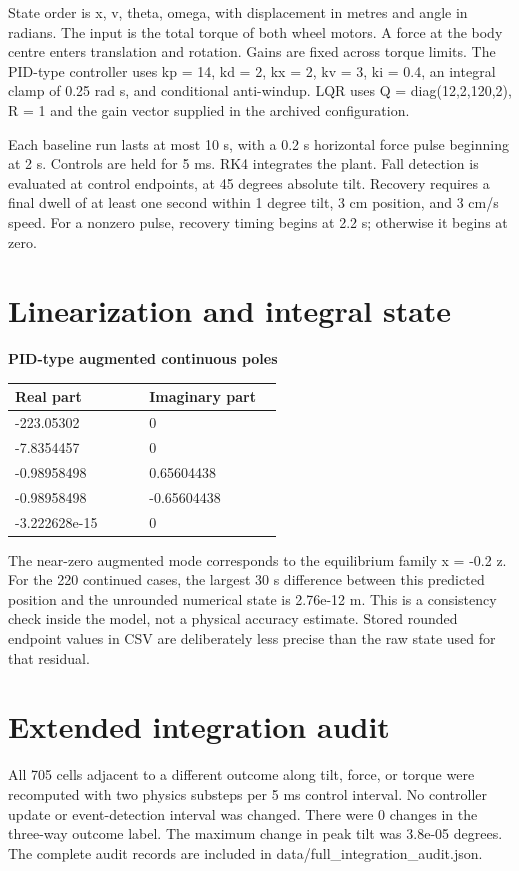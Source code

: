 \documentclass[11pt,a4paper]{article}
\begin{document}
State order is x, v, theta, omega, with displacement in metres and angle in radians. The input is the total torque of both wheel motors. A force at the body centre enters translation and rotation. Gains are fixed across torque limits. The PID-type controller uses kp = 14, kd = 2, kx = 2, kv = 3, ki = 0.4, an integral clamp of 0.25 rad s, and conditional anti-windup. LQR uses Q = diag(12,2,120,2), R = 1 and the gain vector supplied in the archived configuration.

Each baseline run lasts at most 10 s, with a 0.2 s horizontal force pulse beginning at 2 s. Controls are held for 5 ms. RK4 integrates the plant. Fall detection is evaluated at control endpoints, at 45 degrees absolute tilt. Recovery requires a final dwell of at least one second within 1 degree tilt, 3 cm position, and 3 cm/s speed. For a nonzero pulse, recovery timing begins at 2.2 s; otherwise it begins at zero.

\section*{Linearization and integral state}
\textbf{PID-type augmented continuous poles}
\begin{longtable}{p{0.45\linewidth}p{0.45\linewidth}}
\toprule
Real part & Imaginary part \\ \midrule \endhead
-223.05302 & 0 \\
-7.8354457 & 0 \\
-0.98958498 & 0.65604438 \\
-0.98958498 & -0.65604438 \\
-3.222628e-15 & 0 \\
\bottomrule
\end{longtable}
The near-zero augmented mode corresponds to the equilibrium family x = -0.2 z. For the 220 continued cases, the largest 30 s difference between this predicted position and the unrounded numerical state is 2.76e-12 m. This is a consistency check inside the model, not a physical accuracy estimate. Stored rounded endpoint values in CSV are deliberately less precise than the raw state used for that residual.

\section*{Extended integration audit}
All 705 cells adjacent to a different outcome along tilt, force, or torque were recomputed with two physics substeps per 5 ms control interval. No controller update or event-detection interval was changed. There were 0 changes in the three-way outcome label. The maximum change in peak tilt was 3.8e-05 degrees. The complete audit records are included in data/full\_integration\_audit.json.
\end{document}
